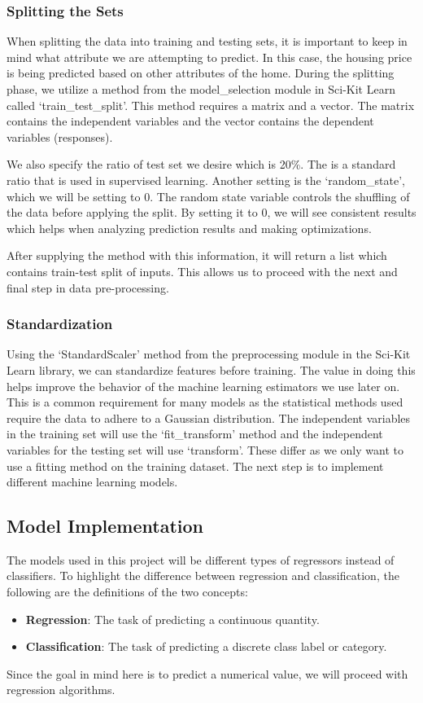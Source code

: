 \documentclass[12pt]{article}
\begin{document}
        \subsubsection{Splitting the Sets}
        When splitting the data into training and testing sets, it is important to keep in mind what attribute we are attempting to predict. 
        In this case, the housing price is being predicted based on other attributes of the home. During the splitting phase, we utilize a method
        from the model\_selection module in Sci-Kit Learn called `train\_test\_split'. This method requires a matrix and a vector. The matrix contains 
        the independent variables and the vector contains the dependent variables (responses). 
        
        We also specify the ratio of test set we desire which 
        is 20\%. The is a standard ratio that is used in supervised learning. Another setting is the `random\_state', which we 
        will be setting to 0. The random state variable controls the shuffling of the data before applying the split\cite{train_test_split}. By setting it to 0, we will see 
        consistent results which helps when analyzing prediction results and making optimizations.

        After supplying the method with this information, it will return a list which contains train-test split of inputs. This allows us to proceed with 
        the next and final step in data pre-processing.

        \subsubsection{Standardization}
        Using the `StandardScaler' method from the preprocessing module in the Sci-Kit Learn library, we can standardize features before training.
        The value in doing this helps improve the behavior of the machine learning estimators we use later on. This is a common requirement for many 
        models as the statistical methods used require the data to adhere to a Gaussian distribution. The independent variables in the training set will use the `fit\_transform' method 
        and the independent variables for the testing set will use `transform'. These differ as we only want to use a fitting method on the training dataset. The 
        next step is to implement different machine learning models.
    \subsection{Model Implementation}
    The models used in this project will be different types of regressors instead of classifiers. To highlight the difference between regression and classification, the following are the 
    definitions of the two concepts\cite{class_vs_reg}:
    \begin{itemize}
        \item \textbf{Regression}: The task of predicting a continuous quantity.
        \item \textbf{Classification}: The task of predicting a discrete class label or category.
    \end{itemize}
    Since the goal in mind here is to predict a numerical value, we will proceed with regression algorithms.
\end{document}
